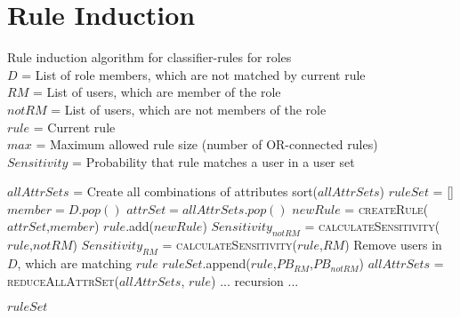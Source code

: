 \section{Rule Induction}
\label{sec:A_ruleInduction}
	\begin{algorithm}[H]
		\small
		\caption{Rule induction algorithm for classifier-rules for roles\protect\\
			$D$ = List of role members, which are not matched by current rule\protect\\
			$RM$ = List of users, which are member of the role\protect\\
			$notRM$ = List of users, which are not members of the role\protect\\
			$rule$ = Current rule\protect\\
			$max$ = Maximum allowed rule size (number of OR-connected rules)\protect\\
			$Sensitivity$ = Probability that rule matches a user in a user set}
		\label{alg:ruleInduction}
		\begin{algorithmic}[1]
			\State $allAttrSets$ = Create all combinations of attributes
			\State sort($allAttrSets$)
			\State $ruleSet$ = []
			\State $member = D.pop()$
			\State $attrSet = allAttrSets.pop()$
			\State $newRule$ = \textsc{createRule}($attrSet$,$member$)
			\State $rule$.add($newRule$)
			\State $Sensitivity_{notRM}$ = \textsc{calculateSensitivity}($rule$,$notRM$)
			\State $Sensitivity_{RM}$ = \textsc{calculateSensitivity}($rule$,$RM$)
			\State Remove users in $D$, which are matching $rule$
			\State $ruleSet$.append($rule$,$PB_{RM}$,$PB_{notRM}$)
			\State $allAttrSets$ = \textsc{reduceAllAttrSet}($allAttrSets$, $rule$)
			\EndIf
			\Else
			\State ... recursion ...
			\iffalse
			\State $extendedRules$ = ruleInduction($D$,$RM$,$notRM$,$rule$,$max$)
			\For {$extendedRule$ in $extendedRules$}
			\State $ruleSet$.append($extendedRule$)
			\If{ $PB_{RM} == 1$ AND $PB_{notRM} == 0$}
			\State $allAttrSets$=\textsc{reduceAllAttrSet}($allAttrSets$, $rule$)
			\EndIf
			\EndFor
			\fi
			\EndIf
			\EndIf
			\EndIf
			\EndWhile 
			\EndWhile
			\State \Return $ruleSet$
			\EndProcedure
		\end{algorithmic}
	\end{algorithm}
